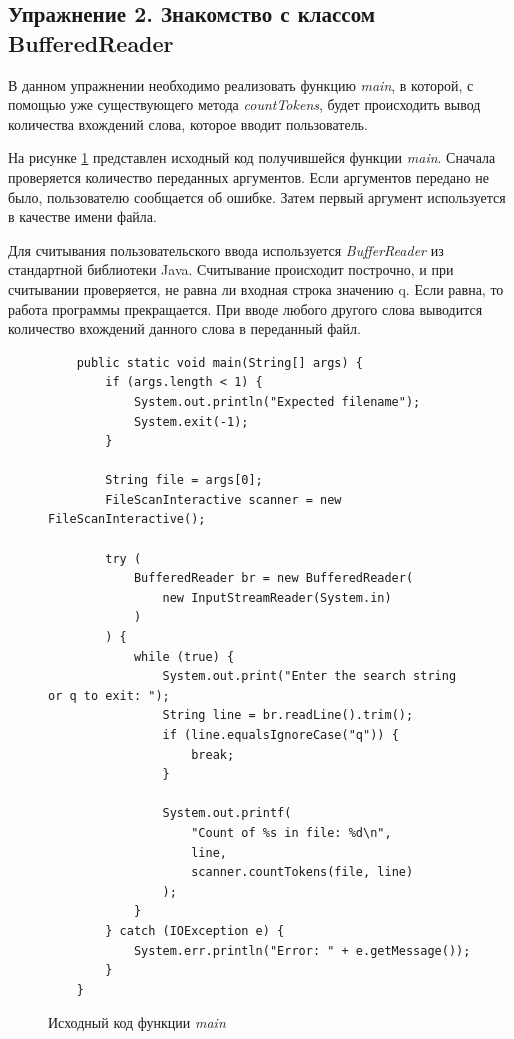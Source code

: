 \documentclass[a4paper, 14pt]{extarticle}
\begin{document}
\subsection*{Упражнение 2. Знакомство с классом BufferedReader}

В данном упражнении необходимо реализовать функцию \textit{main}, в которой, с
помощью уже существующего метода \textit{countTokens}, будет происходить вывод
количества вхождений слова, которое вводит пользователь.

На рисунке \ref{fig:task-2-1} представлен исходный код получившейся функции
\textit{main}. Сначала проверяется количество переданных аргументов. Если
аргументов передано не было, пользователю сообщается об ошибке. Затем первый
аргумент используется в качестве имени файла.

Для считывания пользовательского ввода используется \textit{BufferReader} из
стандартной библиотеки Java. Считывание происходит построчно, и при считывании
проверяется, не равна ли входная строка значению q. Если равна, то работа
программы прекращается. При вводе любого другого слова выводится количество
вхождений данного слова в переданный файл.

\begin{figure}[H]
  \begin{verbatim}
    public static void main(String[] args) {
        if (args.length < 1) {
            System.out.println("Expected filename");
            System.exit(-1);
        }

        String file = args[0];
        FileScanInteractive scanner = new FileScanInteractive();

        try (
            BufferedReader br = new BufferedReader(
                new InputStreamReader(System.in)
            )
        ) {
            while (true) {
                System.out.print("Enter the search string or q to exit: ");
                String line = br.readLine().trim();
                if (line.equalsIgnoreCase("q")) {
                    break;
                }

                System.out.printf(
                    "Count of %s in file: %d\n",
                    line,
                    scanner.countTokens(file, line)
                );
            }
        } catch (IOException e) {
            System.err.println("Error: " + e.getMessage());
        }
    }
  \end{verbatim}
  \caption{Исходный код функции \textit{main}}
  \label{fig:task-2-1}
\end{figure}
\end{document}
